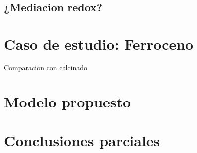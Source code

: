 	\subsection{¿Mediacion redox?}

	\section{Caso de estudio: Ferroceno}

	Comparacion con calcinado



\section{Modelo propuesto}

\section{Conclusiones parciales}





	


